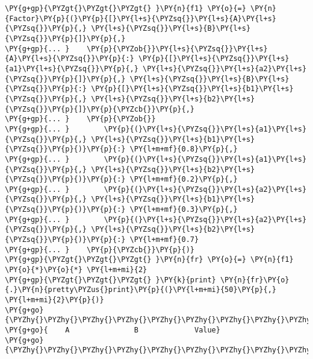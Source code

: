 \begin{fulllineitems}
\begin{Verbatim}[commandchars=\\\{\}]
\PY{g+gp}{\PYZgt{}\PYZgt{}\PYZgt{} }\PY{n}{f1} \PY{o}{=} \PY{n}{Factor}\PY{p}{(}\PY{p}{[}\PY{l+s}{\PYZsq{}}\PY{l+s}{A}\PY{l+s}{\PYZsq{}}\PY{p}{,} \PY{l+s}{\PYZsq{}}\PY{l+s}{B}\PY{l+s}{\PYZsq{}}\PY{p}{]}\PY{p}{,}
\PY{g+gp}{... }    \PY{p}{\PYZob{}}\PY{l+s}{\PYZsq{}}\PY{l+s}{A}\PY{l+s}{\PYZsq{}}\PY{p}{:} \PY{p}{[}\PY{l+s}{\PYZsq{}}\PY{l+s}{a1}\PY{l+s}{\PYZsq{}}\PY{p}{,} \PY{l+s}{\PYZsq{}}\PY{l+s}{a2}\PY{l+s}{\PYZsq{}}\PY{p}{]}\PY{p}{,} \PY{l+s}{\PYZsq{}}\PY{l+s}{B}\PY{l+s}{\PYZsq{}}\PY{p}{:} \PY{p}{[}\PY{l+s}{\PYZsq{}}\PY{l+s}{b1}\PY{l+s}{\PYZsq{}}\PY{p}{,} \PY{l+s}{\PYZsq{}}\PY{l+s}{b2}\PY{l+s}{\PYZsq{}}\PY{p}{]}\PY{p}{\PYZcb{}}\PY{p}{,}
\PY{g+gp}{... }    \PY{p}{\PYZob{}}
\PY{g+gp}{... }        \PY{p}{(}\PY{l+s}{\PYZsq{}}\PY{l+s}{a1}\PY{l+s}{\PYZsq{}}\PY{p}{,} \PY{l+s}{\PYZsq{}}\PY{l+s}{b1}\PY{l+s}{\PYZsq{}}\PY{p}{)}\PY{p}{:} \PY{l+m+mf}{0.8}\PY{p}{,}
\PY{g+gp}{... }        \PY{p}{(}\PY{l+s}{\PYZsq{}}\PY{l+s}{a1}\PY{l+s}{\PYZsq{}}\PY{p}{,} \PY{l+s}{\PYZsq{}}\PY{l+s}{b2}\PY{l+s}{\PYZsq{}}\PY{p}{)}\PY{p}{:} \PY{l+m+mf}{0.2}\PY{p}{,}
\PY{g+gp}{... }        \PY{p}{(}\PY{l+s}{\PYZsq{}}\PY{l+s}{a2}\PY{l+s}{\PYZsq{}}\PY{p}{,} \PY{l+s}{\PYZsq{}}\PY{l+s}{b1}\PY{l+s}{\PYZsq{}}\PY{p}{)}\PY{p}{:} \PY{l+m+mf}{0.3}\PY{p}{,}
\PY{g+gp}{... }        \PY{p}{(}\PY{l+s}{\PYZsq{}}\PY{l+s}{a2}\PY{l+s}{\PYZsq{}}\PY{p}{,} \PY{l+s}{\PYZsq{}}\PY{l+s}{b2}\PY{l+s}{\PYZsq{}}\PY{p}{)}\PY{p}{:} \PY{l+m+mf}{0.7}
\PY{g+gp}{... }    \PY{p}{\PYZcb{}}\PY{p}{)}
\PY{g+gp}{\PYZgt{}\PYZgt{}\PYZgt{} }\PY{n}{fr} \PY{o}{=} \PY{n}{f1} \PY{o}{*}\PY{o}{*} \PY{l+m+mi}{2}
\PY{g+gp}{\PYZgt{}\PYZgt{}\PYZgt{} }\PY{k}{print} \PY{n}{fr}\PY{o}{.}\PY{n}{pretty\PYZus{}print}\PY{p}{(}\PY{l+m+mi}{50}\PY{p}{,} \PY{l+m+mi}{2}\PY{p}{)}
\PY{g+go}{\PYZhy{}\PYZhy{}\PYZhy{}\PYZhy{}\PYZhy{}\PYZhy{}\PYZhy{}\PYZhy{}\PYZhy{}\PYZhy{}\PYZhy{}\PYZhy{}\PYZhy{}\PYZhy{}\PYZhy{}\PYZhy{}\PYZhy{}\PYZhy{}\PYZhy{}\PYZhy{}\PYZhy{}\PYZhy{}\PYZhy{}\PYZhy{}\PYZhy{}\PYZhy{}\PYZhy{}\PYZhy{}\PYZhy{}\PYZhy{}\PYZhy{}\PYZhy{}\PYZhy{}\PYZhy{}\PYZhy{}\PYZhy{}\PYZhy{}\PYZhy{}\PYZhy{}\PYZhy{}\PYZhy{}\PYZhy{}\PYZhy{}\PYZhy{}\PYZhy{}\PYZhy{}\PYZhy{}\PYZhy{}\PYZhy{}\PYZhy{}}
\PY{g+go}{    A               B             Value}
\PY{g+go}{\PYZhy{}\PYZhy{}\PYZhy{}\PYZhy{}\PYZhy{}\PYZhy{}\PYZhy{}\PYZhy{}\PYZhy{}\PYZhy{}\PYZhy{}\PYZhy{}\PYZhy{}\PYZhy{}\PYZhy{}\PYZhy{}\PYZhy{}\PYZhy{}\PYZhy{}\PYZhy{}\PYZhy{}\PYZhy{}\PYZhy{}\PYZhy{}\PYZhy{}\PYZhy{}\PYZhy{}\PYZhy{}\PYZhy{}\PYZhy{}\PYZhy{}\PYZhy{}\PYZhy{}\PYZhy{}\PYZhy{}\PYZhy{}\PYZhy{}\PYZhy{}\PYZhy{}\PYZhy{}\PYZhy{}\PYZhy{}\PYZhy{}\PYZhy{}\PYZhy{}\PYZhy{}\PYZhy{}\PYZhy{}\PYZhy{}\PYZhy{}}

\end{Verbatim}
\end{fulllineitems}
